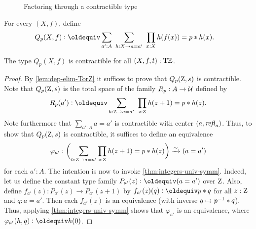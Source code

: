 \documentclass[a4paper,12pt]{amsart}
\begin{document}
\begin{figure}
\caption{\label{fig:TorZ-recursion}Factoring through a contractible type}
\end{figure}

\begin{definition}\label{def:guided-null-hmtps}
For every $(X,f)$, define
\begin{align*}\label{eq:TBD}
Q_p(X,f)&\defeq \sum_{a':A}~\sum_{h:X\to a=a'}~\prod_{x:X} h(f(x))=p\ct h(x).
\end{align*}
\end{definition}

\begin{lemma}\label{lem:guided-null-hmtps}
The type $Q_p(X,f)$ is contractible for all $(X,f,t):{\mathrm{T}\mathbb{Z}}$.
\end{lemma}
\begin{proof}
  By \cref{lem:dep-elim-TorZ} it suffices to prove that $Q_p(\mathrm{Z},s)$ is contractible.
  Note that $Q_p(\mathrm{Z},s)$ is the total space of the family $R_p : A \to \mathcal{U}$ defined by
  \[
    R_p(a') \defeq \sum_{h:\zet \to a=a'}~\prod_{z:\zet} h(z+1)=p\ct h(z).
  \]
  Note furthermore that $\sum_{a':A} a=a'$ is contractible with center $(a,\mathop{{\it refl}_{a}})$.
  Thus, to show that $Q_p(\mathrm{Z},s)$ is contractible,
  it suffices to define an equivalence
  \[
    \varphi_{a'} : \biggl(\sum_{h:\mathrm{Z} \to a=a'}\prod_{z:\mathrm{Z}} h(z+1)=p* h(z)\biggr) \xrightarrow{\sim}{} (a=a')
  \]
  for each $a':A$.
  The intention is now to invoke \cref{thm:integers-univ-symm}.
  Indeed, let us define the constant type family $P_{a'}(z)\defeq(a=a')$
  over $\mathrm{Z}$. Also, define $f_{a'}(z) : P_{a'}(z) \to P_{a'}(z+1)$
  by $f_{a'}(z)(q) \defeq p \ct q$ for all $z:\mathrm{Z}$ and $q: a=a'$.
  Then each $f_{a'}(z)$ is an equivalence (with inverse $q \mapsto p^{-1}* q$).
  Thus, applying \cref{thm:integers-univ-symm}
  shows that $\varphi_{a'}$ is an equivalence,
  where $\varphi_{a'}(h,q) \defeq h(0)$.
\end{proof}
\end{document}
